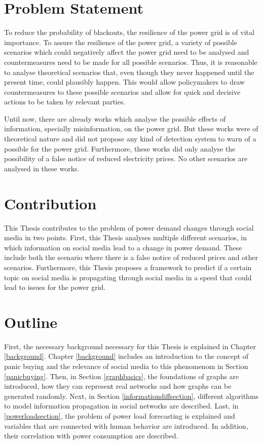 \section{Problem Statement}
\label{problemstatement}

To reduce the probability of blackouts, 
the resilience of the power grid is of vital importance.
To assure the resilience of the power grid, a variety of possible 
scenarios which could negatively affect the power grid need
to be analysed and countermeasures need to be made for all possible scenarios.
Thus, it is reasonable to analyse theoretical scenarios that, even though
they never happened until the present time, could plausibly happen. This 
would allow policymakers to draw countermeasures to these possible scenarios
and allow for quick and decisive actions to be taken by relevant 
parties.

Until now, there are already works which analyse the possible effects
of information, specially misinformation, on the power
grid. But these works were of theoretical nature and did not 
propose any kind of detection system to warn of a possible 
for the power grid. Furthermore, these works did only analyse the 
possibility of a false notice of reduced electricity prices.
No other scenarios are analysed in these works. 


\section{Contribution}
\label{contribution}
This Thesis contributes to the problem of power demand changes
through social media in two points.
First, this Thesis analyses multiple different scenarios, in which
information on social media lead to a change in power demand.
These include both the scenario where there is a false notice of 
reduced prices and other scenarios.
Furthermore, this Thesis proposes a framework to predict if 
a certain topic on social media is propagating through social media
in a speed that could lead to issues for the power grid.

\section{Outline}
\label{outline}

First, the necessary background necessary for this Thesis is explained
in Chapter \ref{background}. Chapter \ref{background} includes an introduction
to the concept of panic buying and the relevance of social media 
to this phenomenom in Section \ref{panicbuying}. Then, in 
Section \ref{graphbasics}, the foundations of graphs are introduced,
how they can represent real networks and how graphs can be
generated randomly. Next, in Section \ref{informationdiffsection},
different algorithms to model information propagation in 
social networks are described. Last, in \ref{powerloadsection},
the problem of power load forecasting is explained and 
variables that are connected with human behavior
are introduced. In addition, their correlation with power consumption are 
described.

